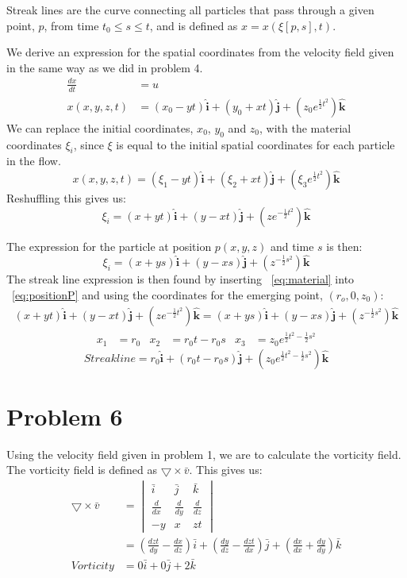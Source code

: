 \documentclass[11pt,a4paper,english]{article}
\numberwithin{equation}{section}
\let\oldhat\hat
\renewcommand{\hat}[1]{\mathbf{\oldhat{#1}}}
\begin{document}
Streak lines are the curve connecting all particles that pass through a given point, $p$, from time $t_0 \leq s \leq t$, and is defined as $x = x(\xi[p,s],t)$.

We derive an expression for the spatial coordinates from the velocity field given in the same way as we did in problem 4.
\begin{align*}
	\frac{dx}{dt} &= u	\\
	x(x,y,z, t) &= (x_0-yt)\hat{i} + (y_0+xt)\hat{j} + (z_0e^{\frac{1}{2}t^2})\hat{k}
\end{align*}
We can replace the initial coordinates, $x_0$, $y_0$ and $z_0$, with the material coordinates $\xi_i$, since $\xi$ is equal to the initial spatial coordinates for each particle in the flow.
$$x(x,y,z, t) = (\xi_1-yt)\hat{i} + (\xi_2+xt)\hat{j} + (\xi_3e^{\frac{1}{2}t^2})\hat{k}$$
Reshuffling this gives us:
\begin{equation} \label{eq:material}
\xi_i = (x+yt)\hat{i} + (y-xt)\hat{j} + (ze^{-\frac{1}{2}t^2})\hat{k}
\end{equation}

The expression for the particle at position $p(x,y,z)$ and time $s$ is then:
\begin{equation} \label{eq:positionP}
\xi_i = (x+ys)\hat{i} + (y-xs)\hat{j} + (z^{-\frac{1}{2}s^2})\hat{k}
\end{equation}
The streak line expression is then found by inserting ~\eqref{eq:material} into ~\eqref{eq:positionP} and using the coordinates for the emerging point, $(r_o, 0, z_0)$:
\begin{align*}
	(x+yt)\hat{i} + (y-xt)\hat{j} + (ze^{-\frac{1}{2}t^2})\hat{k}
		= 
	(x+ys)\hat{i} + (y-xs)\hat{j} + (z^{-\frac{1}{2}s^2})\hat{k}
\end{align*}
\begin{align*}
	x_1 &= r_0 	& 	
	x_2 &= r_0t-r_0s	&	
	x_3 &= z_0e^{\frac{1}{2}t^2 - \frac{1}{2}s^2}
\end{align*}
$$ Streak line = r_0\hat{i} + (r_0t-r_0s)\hat{j} + (z_0e^{\frac{1}{2}t^2 - \frac{1}{2}s^2})\hat{k} $$

\section{Problem 6}
Using the velocity field given in problem 1, we are to calculate the vorticity field.
The vorticity field is defined as $\bigtriangledown \times \bar{v}$.
This gives us:
\begin{align*}
	\bigtriangledown \times \bar{v} &= 		
		\begin{vmatrix}
			\bar{i} 	 & \bar{j} 		& \bar{k}			 		\\
  			\frac{d}{dx} & \frac{d}{dy}	& \frac{d}{dz}				\\
  			-y 			 & x 			& zt			 		
		\end{vmatrix}
		\\
		&=  (\frac{dzt}{dy}-\frac{dx}{dz})\bar{i} + 
			(\frac{dy}{dz}-\frac{dzt}{dx})\bar{j} + 
			(\frac{dx}{dx}+\frac{dy}{dy})\bar{k}
		\\
		Vorticity &= 0\bar{i} + 0\bar{j} + 2\bar{k}
\end{align*}
\end{document}
